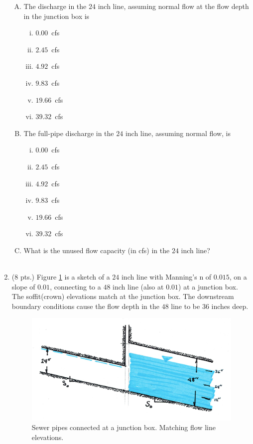 \documentclass[11pt]{article}
\begin{document}
\begin{enumerate}
\begin{enumerate}[(A)]
\item The discharge in the $24$ inch line, assuming normal flow at the flow depth in the junction box is 
\begin{enumerate} [i)]
\item $0.00$~cfs
\item $2.45$~cfs
\item $4.92$~cfs
\item $9.83$~cfs 
\item $19.66$~cfs
\item $39.32$~cfs
\end{enumerate} 
\item The full-pipe discharge in the $24$ inch line, assuming normal flow, is
\begin{enumerate} [i)]
\item $0.00$~cfs
\item $2.45$~cfs
\item $4.92$~cfs
\item $9.83$~cfs 
\item $19.66$~cfs
\item $39.32$~cfs
\end{enumerate} 
\item What is the unused flow capacity (in cfs)  in the $24$ inch line? ~\\ ~\\
\end{enumerate}


\clearpage
\item (8 pts.)
Figure \ref{fig:SewerPipeMatchFlowlineDeep} is a sketch of a $24$ inch line with Manning's n of $0.015$, on a slope of $0.01$, connecting to a $48$ inch line (also at $0.01$) at a junction box.   The soffit(crown) elevations match at the junction box.  The downstream boundary conditions cause the flow depth in the $48$ line to be $36$ inches deep.

\begin{figure}[h!] %
\centering
   \includegraphics[width=4.6in]{SewerPipeMatchFlowlineDeep.jpg}
   \caption{Sewer pipes connected at a junction box.  Matching flow line elevations.}
   \label{fig:SewerPipeMatchFlowlineDeep} 
\end{figure}


\end{enumerate}
\end{document}
